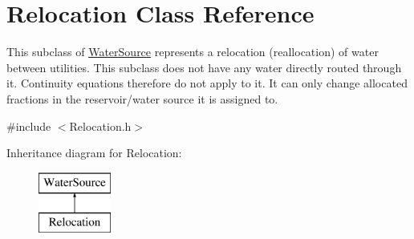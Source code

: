 \hypertarget{classRelocation}{}\section{Relocation Class Reference}
\label{classRelocation}


This subclass of {\ttfamily \mbox{\hyperlink{classWaterSource}{Water\+Source}}} represents a relocation (reallocation) of water between utilities. This subclass does not have any water directly routed through it. Continuity equations therefore do not apply to it. It can only change allocated fractions in the reservoir/water source it is assigned to.  




{\ttfamily \#include $<$Relocation.\+h$>$}

Inheritance diagram for Relocation\+:\begin{figure}[H]
\begin{center}
\leavevmode
\includegraphics[height=2.000000cm]{classRelocation}
\end{center}
\end{figure}

